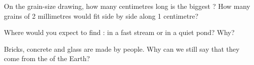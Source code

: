 \begin{exercise}[$\star\star$]\label{exo:g3:stones-pebbles-sand:8}
On the grain-size drawing, how many centimetres long is the biggest ?
How many  grains of 2 millimetres would fit side by side along 1
centimetre?
\end{exercise}

\begin{exercise}[$\star\star$]\label{exo:g3:stones-pebbles-sand:9}
Where would you expect to find : in a fast  stream or in a
quiet pond? Why?
\end{exercise}

\begin{exercise}[$\star\star$]\label{exo:g3:stones-pebbles-sand:10}
Bricks, concrete and glass are made by people. Why can we still say that
they come from the  of the Earth?
\end{exercise}
